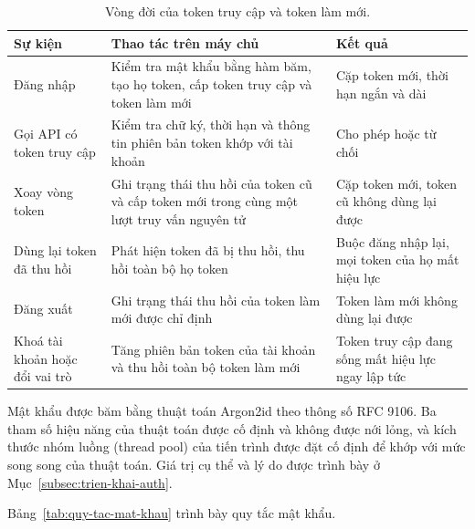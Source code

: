 \begin{table}[htbp]
    \centering
    \caption{Vòng đời của token truy cập và token làm mới.}
    \label{tab:vong-doi-token}
    \small
    \begin{tabularx}{\textwidth}{@{}>{\raggedright\arraybackslash}p{3.1cm}>{\raggedright\arraybackslash}X>{\raggedright\arraybackslash}p{4.6cm}@{}}
        \toprule
        \textbf{Sự kiện} & \textbf{Thao tác trên máy chủ} & \textbf{Kết quả} \\
        \midrule
        Đăng nhập & Kiểm tra mật khẩu bằng hàm băm, tạo họ token, cấp token truy cập và token làm mới & Cặp token mới, thời hạn ngắn và dài \\
        Gọi API có token truy cập & Kiểm tra chữ ký, thời hạn và thông tin phiên bản token khớp với tài khoản & Cho phép hoặc từ chối \\
        Xoay vòng token & Ghi trạng thái thu hồi của token cũ và cấp token mới trong cùng một lượt truy vấn nguyên tử & Cặp token mới, token cũ không dùng lại được \\
        Dùng lại token đã thu hồi & Phát hiện token đã bị thu hồi, thu hồi toàn bộ họ token & Buộc đăng nhập lại, mọi token của họ mất hiệu lực \\
        Đăng xuất & Ghi trạng thái thu hồi của token làm mới được chỉ định & Token làm mới không dùng lại được \\
        Khoá tài khoản hoặc đổi vai trò & Tăng phiên bản token của tài khoản và thu hồi toàn bộ token làm mới & Token truy cập đang sống mất hiệu lực ngay lập tức \\
        \bottomrule
    \end{tabularx}
\end{table}

Mật khẩu được băm bằng thuật toán Argon2id theo thông số RFC 9106. Ba tham số hiệu năng của thuật toán được cố định và không được nới lỏng, và kích thước nhóm luồng (thread pool) của tiến trình được đặt cố định để khớp với mức song song của thuật toán. Giá trị cụ thể và lý do được trình bày ở Mục~\ref{subsec:trien-khai-auth}.

Bảng~\ref{tab:quy-tac-mat-khau} trình bày quy tắc mật khẩu.

